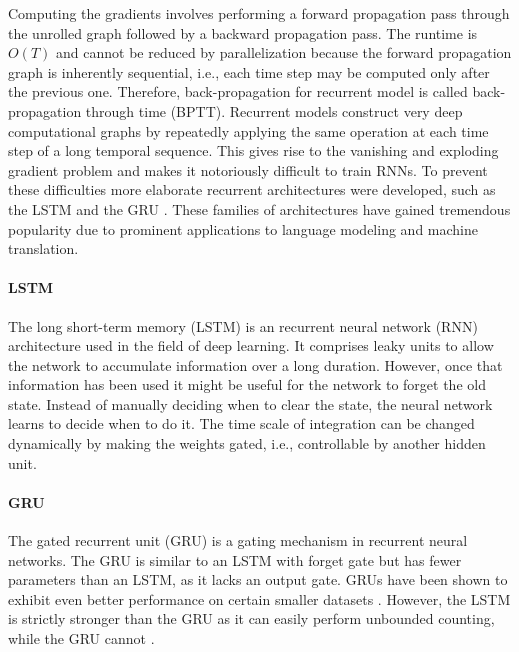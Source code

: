 \documentclass{scrartcl}
\begin{document}
Computing the gradients involves performing a forward propagation pass through the unrolled graph followed by a backward propagation pass. The runtime is $O(T)$ and cannot be reduced by parallelization because the forward propagation graph is inherently sequential, i.e., each time step may be computed only after the previous one. Therefore, back-propagation for recurrent model is called back-propagation through time (BPTT). Recurrent models construct very deep computational graphs by repeatedly applying the same operation at each time step of a long temporal sequence. This gives rise to the vanishing and exploding gradient problem and makes it notoriously difficult to train RNNs. To prevent these difficulties more elaborate recurrent architectures were developed, such as the LSTM \cite{Hochreiter1997} and the GRU \cite{Cho2014}. These families of architectures have gained tremendous popularity due to prominent applications to language modeling and machine translation. 

\paragraph{LSTM}
The long short-term memory (LSTM) \cite{Hochreiter1997} is an recurrent neural network (RNN) architecture used in the field of deep learning. It comprises leaky units to allow the network to accumulate information over a long duration. However, once that information has been used it might be useful for the network to forget the old state. Instead of manually deciding when to clear the state, the neural network learns to decide when to do it. The time scale of integration can be changed dynamically by making the weights gated, i.e., controllable by another hidden unit.

\paragraph{GRU}
The gated recurrent unit (GRU) \cite{Cho2014} is a gating mechanism in recurrent neural networks. The GRU is similar to an LSTM with forget gate but has fewer parameters than an LSTM, as it lacks an output gate. GRUs have been shown to exhibit even better performance on certain smaller datasets \cite{Chung2014}. However, the LSTM is strictly stronger than the GRU as it can easily perform unbounded counting, while the GRU cannot \cite{Weiss2018}.

\end{document}
